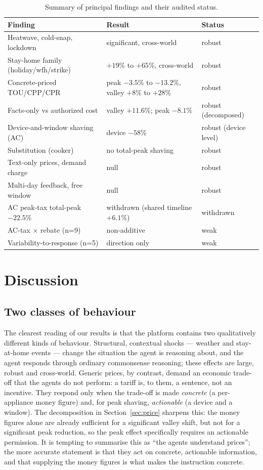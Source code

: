 \documentclass[11pt]{article}
\begin{document}
\begin{table}[ht]
\centering\small
\begin{tabular}{lll}
\toprule
Finding & Result & Status \\
\midrule
Heatwave, cold-snap, lockdown & significant, cross-world & robust \\
Stay-home family (holiday/wfh/strike) & $+19\%$ to $+65\%$, cross-world & robust \\
Concrete-priced TOU/CPP/CPR & peak $-3.5\%$ to $-13.2\%$, valley $+8\%$ to $+28\%$ & robust \\
Facts-only vs authorized cost & valley $+11.6\%$; peak $-8.1\%$ & robust (decomposed) \\
Device-and-window shaving (AC) & device $-58\%$ & robust (device level) \\
Substitution (cooker) & no total-peak shaving & robust \\
Text-only prices, demand charge & null & robust \\
Multi-day feedback, free window & null & robust \\
AC peak-tax total-peak $-22.5\%$ & withdrawn (shared timeline $+6.1\%$) & withdrawn \\
AC-tax $\times$ rebate (n=9) & non-additive & weak \\
Variability-to-response (n=5) & direction only & weak \\
\bottomrule
\end{tabular}
\caption{Summary of principal findings and their audited status.}
\label{tab:summary}
\end{table}

\section{Discussion}
\label{sec:discussion}

\subsection{Two classes of behaviour}
The clearest reading of our results is that the platform contains two qualitatively different kinds of
behaviour. Structural, contextual shocks --- weather and stay-at-home events --- change the situation the
agent is reasoning about, and the agent responds through ordinary commonsense reasoning; these effects
are large, robust and cross-world. Generic prices, by contrast, demand an economic trade-off that the
agents do not perform: a tariff is, to them, a sentence, not an incentive. They respond only when the
trade-off is made \emph{concrete} (a per-appliance money figure) and, for peak shaving, \emph{actionable}
(a device and a window). The decomposition in Section~\ref{sec:price} sharpens this: the money figures
alone are already sufficient for a significant valley shift, but not for a significant peak reduction, so
the peak effect specifically requires an actionable permission. It is tempting to summarise this as ``the
agents understand prices''; the more accurate statement is that they act on concrete, actionable
information, and that supplying the money figures is what makes the instruction concrete.
\end{document}
